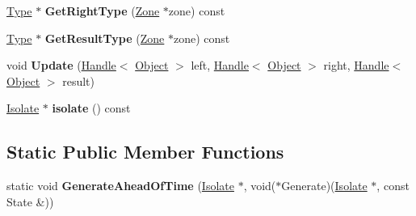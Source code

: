 \begin{DoxyCompactItemize}
\item 
\hypertarget{classv8_1_1internal_1_1_binary_op_i_c_1_1_b_a_s_e___e_m_b_e_d_d_e_d_abeee6e6f029794df98147c17698c182a}{}\hyperlink{classv8_1_1internal_1_1_type_impl}{Type} $\ast$ {\bfseries Get\+Right\+Type} (\hyperlink{classv8_1_1internal_1_1_zone}{Zone} $\ast$zone) const \label{classv8_1_1internal_1_1_binary_op_i_c_1_1_b_a_s_e___e_m_b_e_d_d_e_d_abeee6e6f029794df98147c17698c182a}

\item 
\hypertarget{classv8_1_1internal_1_1_binary_op_i_c_1_1_b_a_s_e___e_m_b_e_d_d_e_d_a12508cb3a6b74b5451b5554e5286f3d5}{}\hyperlink{classv8_1_1internal_1_1_type_impl}{Type} $\ast$ {\bfseries Get\+Result\+Type} (\hyperlink{classv8_1_1internal_1_1_zone}{Zone} $\ast$zone) const \label{classv8_1_1internal_1_1_binary_op_i_c_1_1_b_a_s_e___e_m_b_e_d_d_e_d_a12508cb3a6b74b5451b5554e5286f3d5}

\item 
\hypertarget{classv8_1_1internal_1_1_binary_op_i_c_1_1_b_a_s_e___e_m_b_e_d_d_e_d_aba7d02ece8ba31537f7a2210dffc602f}{}void {\bfseries Update} (\hyperlink{classv8_1_1internal_1_1_handle}{Handle}$<$ \hyperlink{classv8_1_1internal_1_1_object}{Object} $>$ left, \hyperlink{classv8_1_1internal_1_1_handle}{Handle}$<$ \hyperlink{classv8_1_1internal_1_1_object}{Object} $>$ right, \hyperlink{classv8_1_1internal_1_1_handle}{Handle}$<$ \hyperlink{classv8_1_1internal_1_1_object}{Object} $>$ result)\label{classv8_1_1internal_1_1_binary_op_i_c_1_1_b_a_s_e___e_m_b_e_d_d_e_d_aba7d02ece8ba31537f7a2210dffc602f}

\item 
\hypertarget{classv8_1_1internal_1_1_binary_op_i_c_1_1_b_a_s_e___e_m_b_e_d_d_e_d_af42cb973a219d8a333492200094a2c79}{}\hyperlink{classv8_1_1internal_1_1_isolate}{Isolate} $\ast$ {\bfseries isolate} () const \label{classv8_1_1internal_1_1_binary_op_i_c_1_1_b_a_s_e___e_m_b_e_d_d_e_d_af42cb973a219d8a333492200094a2c79}

\end{DoxyCompactItemize}
\subsection*{Static Public Member Functions}
\begin{DoxyCompactItemize}
\item 
\hypertarget{classv8_1_1internal_1_1_binary_op_i_c_1_1_b_a_s_e___e_m_b_e_d_d_e_d_a5af222cdfb398168e09375305e4bd86d}{}static void {\bfseries Generate\+Ahead\+Of\+Time} (\hyperlink{classv8_1_1internal_1_1_isolate}{Isolate} $\ast$, void($\ast$Generate)(\hyperlink{classv8_1_1internal_1_1_isolate}{Isolate} $\ast$, const State \&))\label{classv8_1_1internal_1_1_binary_op_i_c_1_1_b_a_s_e___e_m_b_e_d_d_e_d_a5af222cdfb398168e09375305e4bd86d}

\end{DoxyCompactItemize}
